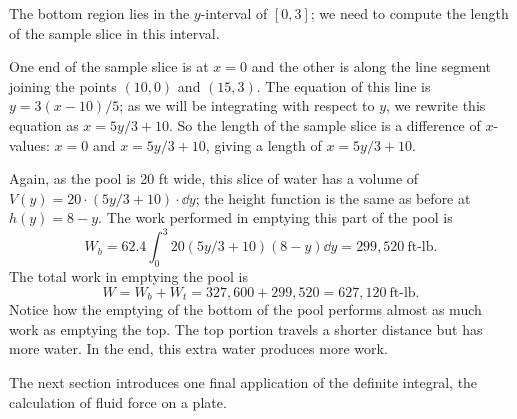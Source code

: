 \begin{example}
The bottom region lies in the $y$-interval of $[0,3]$; we need to compute the length of the sample slice in this interval.

One end of the sample slice is at $x=0$ and the other is along the line segment joining the points $(10,0)$ and $(15,3)$. The equation of this line is $y= 3(x-10)/5$; as we will be integrating with respect to $y$, we rewrite this equation as $x=5y/3+10$. So the length of the sample slice is a difference of $x$-values: $x=0$ and $x=5y/3+10$, giving a length of $x=5y/3+10$. 

Again, as the pool is 20 ft wide, this slice of water has a volume of $V(y) = 20\cdot(5y/3+10)\cdot\dd y$; the height function is the same as before at $h(y)=8-y$. The work performed in emptying this part of the pool is
\[W_b = 62.4\int_0^3 20(5y/3+10)(8-y)\dd y = 299,520\ \text{ft-lb}.\]
The total work in emptying the pool is 
\[W = W_b+W_t = 327,600+299,520 = 627,120\ \text{ft-lb}.\]
Notice how the emptying of the bottom of the pool performs almost as much work as emptying the top. The top portion travels a shorter distance but has more water. In the end, this extra water produces more work.
\end{example}

The next section introduces one final application of the definite integral, the calculation of fluid force on a plate.

